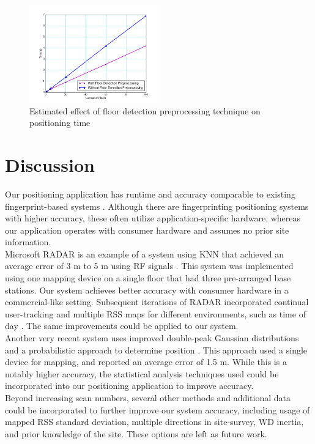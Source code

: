 \documentclass[conference]{IEEEtran}
\begin{document}
\begin{figure}[t!]
  \centering
    \includegraphics[width=0.5\textwidth]{time_comparison.png}
   \caption{Estimated effect of floor detection preprocessing technique on positioning time}
   \label{fig:floor_preprocessing_effect}
\end{figure}

\section{Discussion}
\indent Our positioning application has runtime and accuracy comparable to existing fingerprint-based systems \cite{Liu}. Although there are fingerprinting positioning systems with higher accuracy, these often utilize application-specific hardware, whereas our application operates with consumer hardware and assumes no prior site information.\\
\indent Microsoft RADAR is an example of a system using KNN that achieved an average error of 3 m to 5 m using RF signals \cite{Bahl}. This system was implemented using one mapping device on a single floor that had three pre-arranged base stations. Our system achieves better accuracy with consumer hardware in a commercial-like setting. Subsequent iterations of RADAR incorporated continual user-tracking and multiple RSS maps for different environments, such as time of day \cite{Bahl2}. The same improvements could be applied to our system.\\
\indent Another very recent system uses improved double-peak Gaussian distributions and a probabilistic approach to determine position \cite{Chen}. This approach used a single device for mapping, and reported an average error of 1.5 m. While this is a notably higher accuracy, the statistical analysis techniques used could be incorporated into our positioning application to improve accuracy.\\ 
\indent Beyond increasing scan numbers, several other methods and additional data could be incorporated to further improve our system accuracy, including usage of mapped RSS standard deviation, multiple directions in site-survey, WD inertia, and prior knowledge of the site. These options are left as future work.
\end{document}
